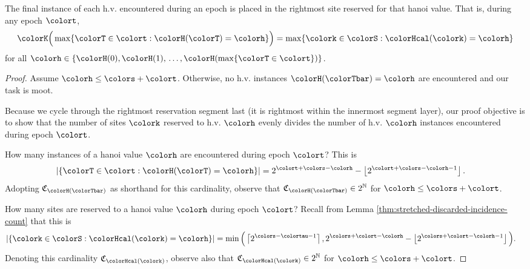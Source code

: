 \begin{lemma}
\label{lemma:tilted-last-touched}
The final instance of each h.v. encountered during an epoch is placed in the rightmost site reserved for that hanoi value.
That is, during any epoch $\colort$,
\begin{align*}
\colorK\Big(
  \max\{\colorT \in \colort : \colorH(\colorT) = \colorh\}
\Big)
=
\max\{\colork \in \colorS : \colorHcal(\colork) = \colorh \}
\end{align*}
for all $\colorh \in \{\colorH(0), \colorH(1), \,\ldots, \colorH(\max\{\colorT \in \colort\})\}$.
\end{lemma}

\begin{proof}
Assume $\colorh \leq \colors + \colort$.
Otherwise, no h.v. instances $\colorH(\colorTbar) = \colorh$ are encountered and our task is moot.

Because we cycle through the rightmost reservation segment last (it is rightmost within the innermost segment layer), our proof objective is to show that the number of sites $\colork$ reserved to h.v. $\colorh$ evenly divides the number of h.v. $\colorh$ instances encountered during epoch $\colort$.

How many instances of a hanoi value $\colorh$ are encountered during epoch $\colort$?
This is
\begin{align*}
|\{\colorT \in \colort : \colorH(\colorT) = \colorh\}|
&=
2^{\colort + \colors - \colorh} - \left\lfloor2^{\colort + \colors - \colorh - 1} \right\rfloor.
\end{align*}
Adopting $\mathfrak{C}_{\colorH(\colorTbar)}$ as shorthand for this cardinality, observe that $\mathfrak{C}_{\colorH(\colorTbar)} \in 2^{\mathbb{N}}$ for $\colorh \leq \colors + \colort$.

How many sites are reserved to a hanoi value $\colorh$ during epoch $\colort$?
Recall from Lemma \ref{thm:stretched-discarded-incidence-count} that this is
\begin{align*}
|\{\colork \in \colorS : \colorHcal(\colork) = \colorh\}|
&=
\min\Big(
\left\lceil 2^{\colors - \colortau - 1} \right\rceil,
2^{\colors + \colort - \colorh} - \left\lfloor 2^{\colors + \colort - \colorh - 1} \right\rfloor
\Big).
\end{align*}
Denoting this cardinality $\mathfrak{C}_{\colorHcal(\colork)}$, observe also that
$\mathfrak{C}_{\colorHcal(\colork)} \in 2^{\mathbb{N}}$ for $\colorh \leq \colors + \colort$.


\end{proof}
